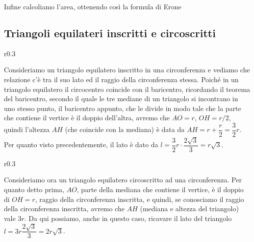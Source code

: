 Infine calcoliamo l'area, ottenendo così la formula di Erone


\pagebreak

\subsection{Triangoli equilateri inscritti e circoscritti}

\setlength{\intextsep}{3pt plus 2.0pt minus 2.0pt}
\begin{wrapfigure}{r}{0.3\textwidth}
	\centering
\end{wrapfigure}
Consideriamo un triangolo equilatero inscritto in una circonferenza e vediamo che relazione c'è tra il suo lato ed il raggio della circonferenza stessa.
Poiché in un triangolo equilatero il circocentro coincide con il baricentro, ricordando il teorema del baricentro, secondo il quale le tre mediane di un triangolo si incontrano in uno stesso punto, il baricentro appunto, che le divide in modo tale che la parte che contiene il vertice è il doppio dell'altra, avremo che $AO = r$, $OH = r/2$, quindi l'altezza $AH$ (che coincide con la mediana) è data da $AH = r+\dfrac{r}{2}=\dfrac{3}{2}r$.
Per quanto visto precedentemente, il lato è dato da $l=\dfrac{3}{2}r\cdot\dfrac{2\sqrt{3}}{3}=r\sqrt{3}$. 

\begin{wrapfigure}{r}{0.3\textwidth}
	\centering
\end{wrapfigure}
Consideriamo ora un triangolo equilatero circoscritto ad una circonferenza.
Per quanto detto prima, $AO$, parte della mediana che contiene il vertice, è il doppio di $OH = r$, raggio della circonferenza inscritta, e quindi, se conosciamo il raggio della circonferenza inscritta, avremo che $AH$ (mediana e altezza del triangolo) vale $3r$. Da qui possiamo, anche in questo caso, ricavare il lato del triangolo $l=3r\dfrac{2\sqrt{3}}{3}=2r\sqrt{3}$.\\
~\\

